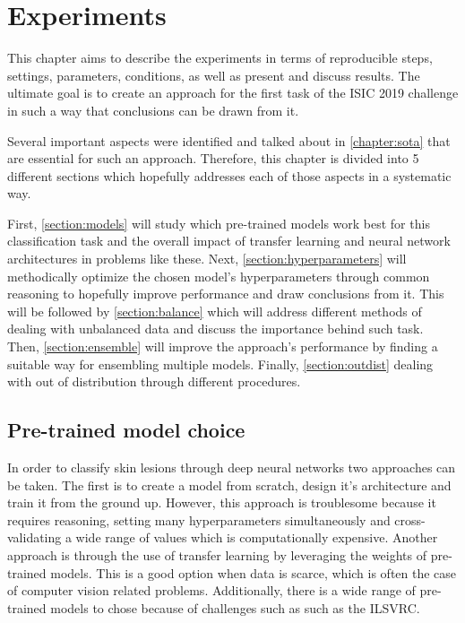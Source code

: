 \chapter{Experiments}
\label{chapter:experiments}

This chapter aims to describe the experiments in terms of reproducible steps, settings, parameters, conditions, as well as present and discuss results. The ultimate goal is to create an approach for the first task of the ISIC 2019 challenge in such a way that conclusions can be drawn from it. \par


Several important aspects were identified and talked about in \autoref{chapter:sota} that are essential for such an approach. Therefore, this chapter is divided into 5 different sections which hopefully addresses each of those aspects in a systematic way. \par

First, \autoref{section:models} will study which pre-trained models work best for this classification task and the overall impact of transfer learning and neural network architectures in problems like these. Next, \autoref{section:hyperparameters} will methodically optimize the chosen model's hyperparameters through common reasoning to hopefully improve performance and draw conclusions from it. This will be followed by \autoref{section:balance} which will address different methods of dealing with unbalanced data and discuss the importance behind such task. Then, \autoref{section:ensemble} will improve the approach's performance by finding a suitable way for ensembling multiple models. Finally, \autoref{section:outdist} dealing with out of distribution through different procedures. \par 

\section{Pre-trained model choice} \label{section:models}
    In order to classify skin lesions through deep neural networks two approaches can be taken. The first is to create a model from scratch, design it's architecture and train it from the ground up. However, this approach is troublesome because it requires reasoning, setting many hyperparameters simultaneously and cross-validating a wide range of values which is computationally expensive. Another approach is through the use of transfer learning by leveraging the weights of pre-trained models. This is a good option when data is scarce, which is often the case of computer vision related problems. Additionally, there is a wide range of pre-trained models to chose because of challenges such as such as the ILSVRC. \par
    
